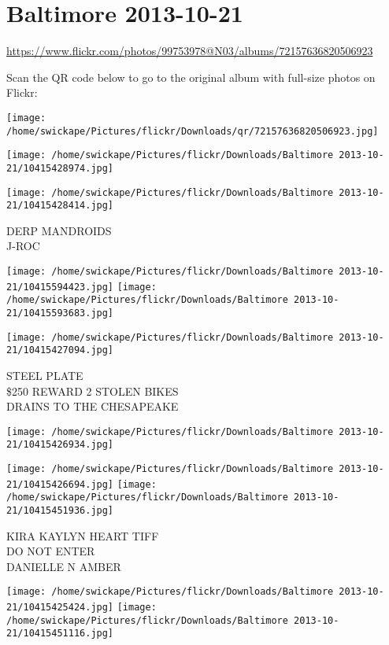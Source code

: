 \documentclass[10pt,letterpaper]{article}
\title{}
\author{}
\date{}
\begin{document}
\section*{Baltimore 2013-10-21}

\url{https://www.flickr.com/photos/99753978@N03/albums/72157636820506923}

Scan the QR code below to go to the original album with full-size photos on Flickr:

\texttt{[image: /home/swickape/Pictures/flickr/Downloads/qr/72157636820506923.jpg]}
\pagebreak

\texttt{[image: /home/swickape/Pictures/flickr/Downloads/Baltimore 2013-10-21/10415428974.jpg]}

\vspace{0.25in}
\texttt{[image: /home/swickape/Pictures/flickr/Downloads/Baltimore 2013-10-21/10415428414.jpg]}

DERP MANDROIDS\\
J{-}ROC
\pagebreak

\texttt{[image: /home/swickape/Pictures/flickr/Downloads/Baltimore 2013-10-21/10415594423.jpg]}
\texttt{[image: /home/swickape/Pictures/flickr/Downloads/Baltimore 2013-10-21/10415593683.jpg]}

\vspace{0.25in}
\texttt{[image: /home/swickape/Pictures/flickr/Downloads/Baltimore 2013-10-21/10415427094.jpg]}

STEEL PLATE\\
\$250 REWARD 2 STOLEN BIKES\\
DRAINS TO THE CHESAPEAKE
\pagebreak

\texttt{[image: /home/swickape/Pictures/flickr/Downloads/Baltimore 2013-10-21/10415426934.jpg]}

\vspace{0.25in}
\texttt{[image: /home/swickape/Pictures/flickr/Downloads/Baltimore 2013-10-21/10415426694.jpg]}
\texttt{[image: /home/swickape/Pictures/flickr/Downloads/Baltimore 2013-10-21/10415451936.jpg]}

KIRA KAYLYN HEART TIFF\\
DO NOT ENTER\\
DANIELLE N AMBER
\pagebreak

\texttt{[image: /home/swickape/Pictures/flickr/Downloads/Baltimore 2013-10-21/10415425424.jpg]}
\texttt{[image: /home/swickape/Pictures/flickr/Downloads/Baltimore 2013-10-21/10415451116.jpg]}
\end{document}
